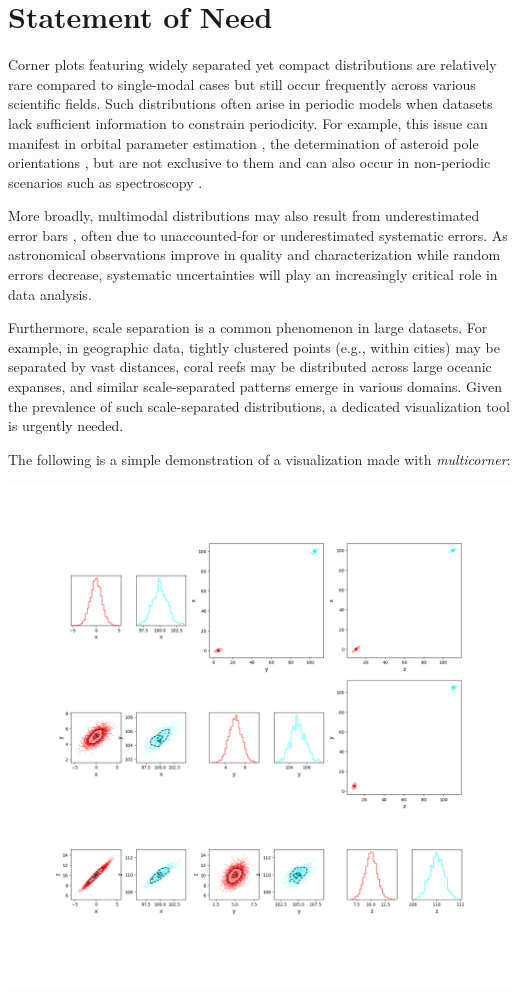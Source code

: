 \documentclass[]{article}
\begin{document}
\section{Statement of Need}\label{statement-of-need}

Corner plots featuring widely separated yet compact distributions are relatively rare compared to single-modal cases but still occur frequently across various scientific fields. Such distributions often arise in periodic models when datasets lack sufficient information to constrain periodicity. For example, this issue can manifest in orbital parameter estimation \cite{Blunt_2017}, the determination of asteroid pole orientations \cite{Magnusson_1986}, but are not exclusive to them and can also occur in non-periodic scenarios such as spectroscopy \cite{Damiano_2023}.

More broadly, multimodal distributions may also result from underestimated error bars \cite{Hogg_2010}, often due to unaccounted-for or underestimated systematic errors. As astronomical observations improve in quality and characterization while random errors decrease, systematic uncertainties will play an increasingly critical role in data analysis.

Furthermore, scale separation is a common phenomenon in large datasets. For example, in geographic data, tightly clustered points (e.g., within cities) may be separated by vast distances, coral reefs may be distributed across large oceanic expanses, and similar scale-separated patterns emerge in various domains. Given the prevalence of such scale-separated distributions, a dedicated visualization tool is urgently needed.


The following is a simple demonstration of a visualization made with \emph{multicorner}:


\includegraphics[width=1.0\textwidth]{multicornerplot.png}
\end{document}
